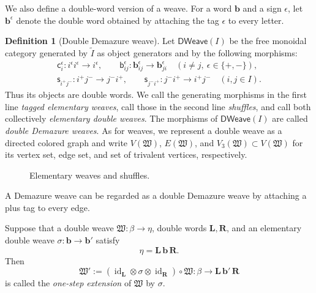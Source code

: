 \documentclass[10pt,a4paper]{article}
\theoremstyle{definition}
\newtheorem{definition}[theorem]{Definition}
\theoremstyle{remark}
\newcommand{\fW}{\mathfrak W}
\newcommand{\id}{\operatorname{id}}
\begin{document}
We also define a double-word version of a weave.  For a word \(\mathbf b\) and
a sign \(\epsilon\), let \(\mathbf b^\epsilon\) denote the double word
obtained by attaching the tag \(\epsilon\) to every letter.

\begin{definition}[Double Demazure weave]
\label{def:double-weave}
Let \(\mathsf{DWeave}(I)\) be the free monoidal category generated by
\(\widetilde I\) as object generators and by the following morphisms:
\[
 \begin{gathered}
  \mathsf c_i^\epsilon: i^\epsilon i^\epsilon\longrightarrow i^\epsilon,
  \qquad
  \mathsf b_{ij}^\epsilon: \mathbf b_{ij}^\epsilon\longrightarrow\mathbf b_{ji}^\epsilon
  \quad(i\ne j,\ \epsilon\in\{+,-\}),\\
  \mathsf s_{i^+ j^-}: i^+j^-\longrightarrow j^-i^+,
  \qquad
  \mathsf s_{j^- i^+}: j^-i^+\longrightarrow i^+j^-
  \quad(i,j\in I).
 \end{gathered}
\]
Thus its objects are double words.  We call the generating morphisms in the
first line \emph{tagged elementary weaves}, call those in the second line
\emph{shuffles}, and call both collectively \emph{elementary double weaves}.
The morphisms of \(\mathsf{DWeave}(I)\) are called \emph{double Demazure
weaves}.  As for weaves, we represent a double weave as a directed colored
graph and write \(V(\fW)\), \(E(\fW)\), and
\(V_3(\fW)\subset V(\fW)\) for its vertex set, edge set, and set of trivalent
vertices, respectively.
\end{definition}

\begin{figure}[htbp]
\centering

\caption{Elementary weaves and shuffles.}
\label{fig:basic-weave-generators}
\end{figure}

A Demazure weave can be regarded as a double Demazure weave by attaching a
plus tag to every edge.

Suppose that a double weave \(\fW:\beta\to\eta\), double words
\(\mathbf L,\mathbf R\), and an elementary double weave
\(\sigma:\mathbf b\to\mathbf b'\) satisfy
\[
 \eta=\mathbf L\,\mathbf b\,\mathbf R.
\]
Then
\begin{equation}
 \fW'
 :=(\id_{\mathbf L}\otimes\sigma\otimes\id_{\mathbf R})\circ\fW:
 \beta\longrightarrow\mathbf L\,\mathbf b'\,\mathbf R
 \label{eq:double-weave-one-step-extension}
\end{equation}
is called the \emph{one-step extension} of \(\fW\) by \(\sigma\).
\end{document}
